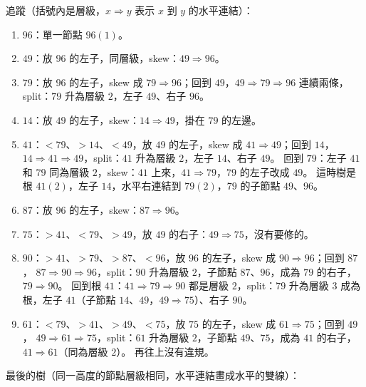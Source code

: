 \begin{pastsoln}
追蹤（括號內是層級，$x \Rightarrow y$ 表示 $x$ 到 $y$ 的水平連結）：
\begin{enumerate}
\item $96$：單一節點 $96(1)$。
\item $49$：放 $96$ 的左子，同層級，skew：$49 \Rightarrow 96$。
\item $79$：放 $96$ 的左子，skew 成 $79 \Rightarrow 96$；回到 $49$，$49 \Rightarrow 79 \Rightarrow 96$ 連續兩條，
split：$79$ 升為層級 $2$，左子 $49$、右子 $96$。
\item $14$：放 $49$ 的左子，skew：$14 \Rightarrow 49$，掛在 $79$ 的左邊。
\item $41$：$< 79$、$> 14$、$< 49$，放 $49$ 的左子，skew 成 $41 \Rightarrow 49$；回到 $14$，
$14 \Rightarrow 41 \Rightarrow 49$，split：$41$ 升為層級 $2$，左子 $14$、右子 $49$。 回到 $79$：左子 $41$ 和
$79$ 同為層級 $2$，skew：$41$ 上來，$41 \Rightarrow 79$，$79$ 的左子改成 $49$。 這時樹是根 $41(2)$，左子
$14$，水平右連結到 $79(2)$，$79$ 的子節點 $49$、$96$。
\item $87$：放 $96$ 的左子，skew：$87 \Rightarrow 96$。
\item $75$：$> 41$、$< 79$、$> 49$，放 $49$ 的右子：$49 \Rightarrow 75$，沒有要修的。
\item $90$：$> 41$、$> 79$、$> 87$、$< 96$，放 $96$ 的左子，skew 成 $90 \Rightarrow 96$；回到 $87$，
$87 \Rightarrow 90 \Rightarrow 96$，split：$90$ 升為層級 $2$，子節點 $87$、$96$，成為 $79$ 的右子，
$79 \Rightarrow 90$。 回到根 $41$：$41 \Rightarrow 79 \Rightarrow 90$ 都是層級 $2$，split：$79$ 升為層級 $3$
成為根，左子 $41$（子節點 $14$、$49$，$49 \Rightarrow 75$）、右子 $90$。
\item $61$：$< 79$、$> 41$、$> 49$、$< 75$，放 $75$ 的左子，skew 成 $61 \Rightarrow 75$；回到 $49$，
$49 \Rightarrow 61 \Rightarrow 75$，split：$61$ 升為層級 $2$，子節點 $49$、$75$，成為 $41$ 的右子，
$41 \Rightarrow 61$（同為層級 $2$）。 再往上沒有違規。
\end{enumerate}
最後的樹（同一高度的節點層級相同，水平連結畫成水平的雙線）：
\begin{center}
\end{center}
\end{pastsoln}
